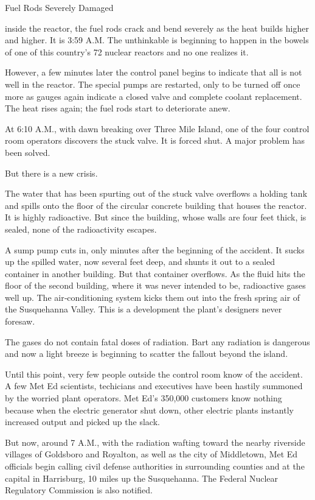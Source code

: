 Fuel Rods Severely Damaged

inside the reactor, the fuel rods crack and bend severely as the heat
builds higher and higher. It is 3:59 A.M. The unthinkable is beginning
to happen in the bowels of one of this country's 72 nuclear reactors and
no one realizes it.

However, a few minutes later the control panel begins to indicate that
all is not well in the reactor. The special pumps are restarted, only to
be turned off once more as gauges again indicate a closed valve and
complete coolant replacement. The heat rises again; the fuel rods start
to deteriorate anew.

At 6:10 A.M., with dawn breaking over Three Mile Island, one of the four
control room operators discovers the stuck valve. It is forced shut. A
major problem has been solved.

But there is a new crisis.

The water that has been spurting out of the stuck valve overflows a
holding tank and spills onto the floor of the circular concrete building
that houses the reactor. It is highly radioactive. But since the
building, whose walls are four feet thick, is sealed, none of the
radioactivity escapes.

A sump pump cuts in, only minutes after the beginning of the accident.
It sucks up the spilled water, now several feet deep, and shunts it out
to a sealed container in another building. But that container overflows.
As the fluid hits the floor of the second building, where it was never
intended to be, radioactive gases well up. The air‐conditioning system
kicks them out into the fresh spring air of the Susquehanna Valley. This
is a development the plant's designers never foresaw.

The gases do not contain fatal doses of radiation. Bart any radiation is
dangerous and now a light breeze is beginning to scatter the fallout
beyond the island.

Until this point, very few people outside the control room know of the
accident. A few Met Ed scientists, techicians and executives have been
hastily summoned by the worried plant operators. Met Ed's 350,000
customers know nothing because when the electric generator shut down,
other electric plants instantly increased output and picked up the
slack.

But now, around 7 A.M., with the radiation wafting toward the nearby
riverside villages of Goldsboro and Royalton, as well as the city of
Middletown, Met Ed officials begin calling civil defense authorities in
surrounding counties and at the capital in Harrisburg, 10 miles up the
Susquehanna. The Federal Nuclear Regulatory Commission is also notified.

